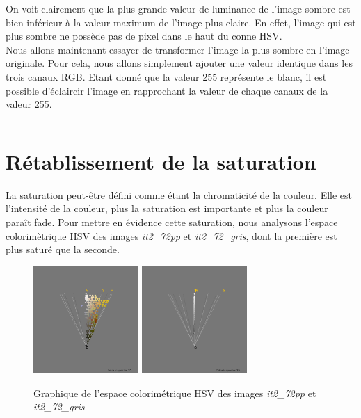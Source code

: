 \documentclass[a4paper,10pt]{article}
\begin{document}
On voit clairement que la plus grande valeur de luminance de l'image sombre est bien inférieur
à la valeur maximum de l'image plus claire. En effet, l'image qui est plus sombre ne possède pas de pixel dans le haut du conne
HSV.\\

Nous allons maintenant essayer de transformer l'image la plus sombre en l'image originale. Pour cela,
nous allons simplement ajouter une valeur identique dans les trois canaux RGB. Etant donné que la valeur 255
représente le blanc, il est possible d'éclaircir l'image en rapprochant la valeur de chaque canaux de la valeur 255.

\begin{tabular}{|c|c|c|}
 
\end{tabular}


\section{Rétablissement de la saturation}
La saturation peut-être défini comme étant la chromaticité de la couleur. Elle est l'intensité de la couleur, plus
la saturation est importante et plus la couleur paraît fade. Pour mettre en évidence cette saturation, nous analysons
l'espace colorimètrique HSV des images \textit{it2\_72pp} et \textit{it2\_72\_gris}, dont la première est plus saturé
que la seconde.\\

\begin{figure}[!h]
 \begin{center}
 \includegraphics[width=4cm]{resultat/saturation1.png}
 \includegraphics[width=4cm]{resultat/saturation2.png}
 \caption{Graphique de l'espace colorimétrique HSV des images \textit{it2\_72pp} et \textit{it2\_72\_gris}}
 \end{center}
\end{figure}
\end{document}
